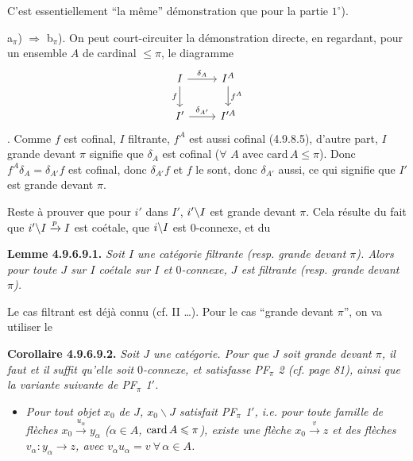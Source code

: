 C'est essentiellement “la même” démonstration que pour la partie $1^\circ$).

a$_\pi$) $\Longrightarrow$ b$_\pi$). On peut court-circuiter la démonstration directe, en regardant, pour un ensemble $A$ de cardinal $\leqslant \pi$, le diagramme
\[
\begin{tikzcd}
I \arrow[r, "\delta_A"] \arrow[d, "f"'] & I^A \arrow[d, "f^A"] \\
I' \arrow[r, "\delta_{A'}"] & I'^A
\end{tikzcd}
\]
. Comme $f$ est cofinal, $I$ filtrante, $f^A$ est aussi cofinal (4.9.8.5), d'autre part, $I$ grande devant $\pi$ signifie que $\delta_A$ est cofinal ($\forall$ $A$ avec $\mathrm{card}\, A \leqslant \pi$). Donc $f^A\delta_A = \delta_{A'}f$ est cofinal, donc $\delta_{A'}f$ et $f$ le sont, donc $\delta_{A'}$ aussi, ce qui signifie que $I'$ est grande devant $\pi$.

Reste à prouver que pour $i'$ dans $I'$, $i'\backslash I$ est grande devant $\pi$. Cela résulte du fait que $i'\backslash I \xrightarrow{p} I$ est coétale, que $i\backslash I$ est 0-connexe, et du

\textbf{Lemme 4.9.6.9.1.} \textit{Soit $I$ une catégorie filtrante (resp. grande devant $\pi$). Alors pour toute $J$ sur $I$ coétale sur $I$ et $0$-connexe, $J$ est filtrante (resp. grande devant $\pi$).}


Le cas filtrant est déjà connu (cf. II \dots). Pour le cas “grande devant $\pi$”, on va utiliser le

\textbf{Corollaire 4.9.6.9.2.} \textit{Soit $J$ une catégorie. Pour que $J$ soit grande devant $\pi$, il}
\textit{faut et il suffit qu'elle soit $0$-connexe, et satisfasse PF$_\pi$ 2 (cf. page 81), ainsi que la variante suivante de PF$_\pi$ 1$'$.}
\begin{itemize}[leftmargin=4em]
\item[\textit{PF$_\pi$ 1)}] \textit{Pour tout objet $x_0$ de $J$, $x_0\backslash J$ satisfait PF$_\pi$ 1$'$, i.e. pour toute famille de flèches $x_0 \xrightarrow{u_\alpha} y_\alpha$ ($\alpha \in A$, $\operatorname{card} A \leqslant \pi$), existe une flèche $x_0 \xrightarrow{v} z$ et des flèches $v_\alpha : y_\alpha \longrightarrow z$, avec $v_\alpha u_\alpha = v \ \forall\, \alpha \in A$.}
\end{itemize}

